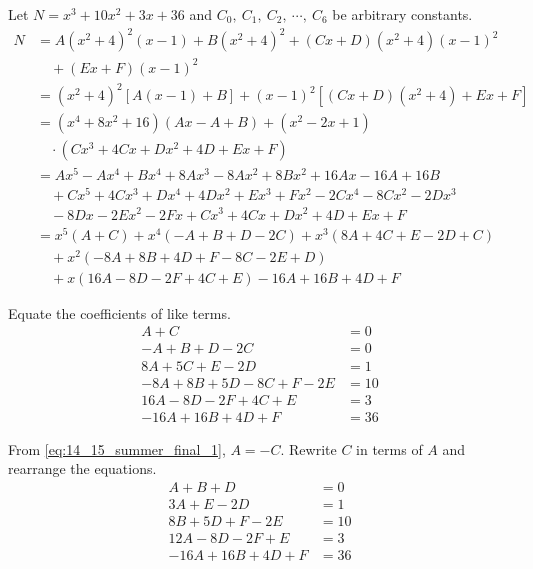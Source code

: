 \documentclass[a4paper, 12pt]{article}
\begin{document}
\begin{enumerate}[leftmargin=*,label=\textbf{\arabic*.}]
\begin{enumerate}[leftmargin=*,label=\textbf{\alph*.}]
Let $N=x^3+10x^2+3x+36$ and $C_0,\:C_1,\:C_2,\:\cdots,\:C_6$ be arbitrary constants.
\begin{align*}
N&=A\left(x^2+4\right)^2(x-1)+B\left(x^2+4\right)^2+(Cx+D)\left(x^2+4\right)(x-1)^2\\[1em]&\quad+(Ex+F)(x-1)^2\\[1em]&=\left(x^2+4\right)^2\left[A(x-1)+B\right]+(x-1)^2\left[(Cx+D)\left(x^2+4\right)+Ex+F\right]\\[1em]&=\left(x^4+8x^2+16\right)(Ax-A+B)+\left(x^2-2x+1\right)\\&\hspace{1em}\cdot\left(Cx^3+4Cx+Dx^2+4D+Ex+F\right)\\[1em]&=Ax^5-Ax^4+Bx^4+8Ax^3-8Ax^2+8Bx^2+16Ax-16A+16B\\&\hspace{1em}+Cx^5+4Cx^3+Dx^4+4Dx^2+Ex^3+Fx^2-2Cx^4-8Cx^2-2Dx^3\\&\hspace{1em}-8Dx-2Ex^2-2Fx+Cx^3+4Cx+Dx^2+4D+Ex+F\\[1em]&=x^5\left(A+C\right)+x^4\left(-A+B+D-2C\right)+x^3\left(8A+4C+E-2D+C\right)\\&\hspace{1em}+x^2\left(-8A+8B+4D+F-8C-2E+D\right)\\&\hspace{1em}+x\left(16A-8D-2F+4C+E\right)-16A+16B+4D+F
\end{align*}

Equate the coefficients of like terms.
\begin{align}
A+C&=0\label{eq:14_15_summer_final_1}\\
-A+B+D-2C&=0\nonumber\\
8A+5C+E-2D&=1\nonumber\\
-8A+8B+5D-8C+F-2E&=10\nonumber\\
16A-8D-2F+4C+E&=3\nonumber\\
-16A+16B+4D+F&=36\nonumber
\end{align}

From \eqref{eq:14_15_summer_final_1}, $A=-C$. Rewrite $C$ in terms of $A$ and rearrange the equations.
\begin{align}
A+B+D&=0\label{eq:14_15_summer_final_2}\\
3A+E-2D&=1\nonumber\\
8B+5D+F-2E&=10\nonumber\\
12A-8D-2F+E&=3\nonumber\\
-16A+16B+4D+F&=36\nonumber
\end{align}


\end{enumerate}
\end{enumerate}
\end{document}
